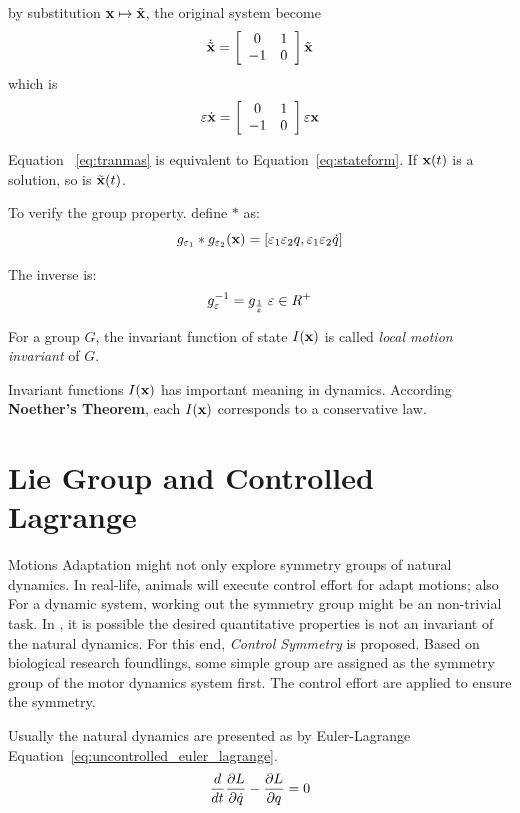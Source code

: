 by substitution $\mathbf{x} \mapsto \tilde{\mathbf{x}}$, the original system become
\[ 
\dot{\tilde{\mathbf{x}}}=
\left[ 
\begin{array}{cc}
0 &1\\
-1 &0 
\end{array}
\right]\tilde{\mathbf{x}}
\]
which is 
\begin{equation}
\label{eq:tranmas} 
\varepsilon \dot{\mathbf{x}}=
\left[ 
\begin{array}{cc}
0 &1\\
-1 &0 
\end{array}
\right]\varepsilon \mathbf{x}
\end{equation}

Equation ~\ref{eq:tranmas} is equivalent to  Equation~\ref{eq:stateform}.
If $\mathbf{x}(t)$ is a solution, so is $\tilde{\mathbf{x}}(t)$.

To verify the group property. define $*$ as:
\[
g_{\varepsilon_1}*g_{\varepsilon_2}(\mathbf{x})=[\varepsilon_1 \varepsilon_2 q, \varepsilon_1 \varepsilon_2 \dot{q}]
\]

The inverse is:
\[
g_{\varepsilon}^{-1}=g_{\frac{1}{\varepsilon}} \;\varepsilon \in R^+
\]

\begin{mydef}
For a group $G$, the invariant function of state $I(\mathbf{x})$ is called \emph{local motion invariant} of $G$. 
\end{mydef}

Invariant functions $I(\mathbf{x})$ has important  meaning in dynamics. 
According  \textbf{Noether's Theorem}, each $I(\mathbf{x})$ corresponds to a conservative law. 


\section{Lie Group and Controlled Lagrange}
\label{sec:liecontrol}
Motions Adaptation might not only explore symmetry groups of natural dynamics.
In real-life, animals will execute control effort for adapt motions; also For a dynamic system, working out the symmetry group might be an non-trivial task.
In \cms, it is possible the desired quantitative properties is not an invariant of the natural dynamics.
For this end, \emph{Control Symmetry} is proposed.
Based on biological research foundlings\citep{flash2007affine}, some simple group are assigned as the symmetry group of the motor dynamics system first.
The control effort are applied to ensure the symmetry.


Usually the natural dynamics are presented as by Euler-Lagrange Equation~\ref{eq:uncontrolled_euler_lagrange}\citep{Goldstein2002}.
\begin{equation}
\frac{d}{dt} \frac{\partial L}{\partial \dot{q}} - \frac{\partial L}{\partial q} = 0
\label{eq:uncontrolled_euler_lagrange}
\end{equation}

